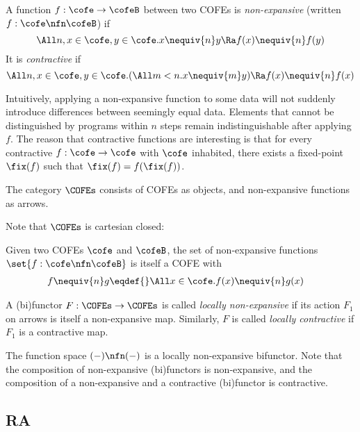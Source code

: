 \begin{defn}
  A function $f : \cofe \to \cofeB$ between two COFEs is \emph{non-expansive} (written $f : \cofe \nfn \cofeB$) if
  \[\All n, x \in \cofe, y \in \cofe. x \nequiv{n} y \Ra f(x) \nequiv{n} f(y) \]
  It is \emph{contractive} if
  \[ \All n, x \in \cofe, y \in \cofe. (\All m < n. x \nequiv{m} y) \Ra f(x) \nequiv{n} f(x) \]
\end{defn}
Intuitively, applying a non-expansive function to some data will not suddenly introduce differences between seemingly equal data.
Elements that cannot be distinguished by programs within $n$ steps remain indistinguishable after applying $f$.
The reason that contractive functions are interesting is that for every contractive $f : \cofe \to \cofe$ with $\cofe$ inhabited, there exists a fixed-point $\fix(f)$ such that $\fix(f) = f(\fix(f))$.

\begin{defn}
  The category $\COFEs$ consists of COFEs as objects, and non-expansive functions as arrows.
\end{defn}

Note that $\COFEs$ is cartesian closed:
\begin{defn}
  Given two COFEs $\cofe$ and $\cofeB$, the set of non-expansive functions $\set{f : \cofe \nfn \cofeB}$ is itself a COFE with
  \begin{align*}
    f \nequiv{n} g \eqdef{}& \All x \in \cofe. f(x) \nequiv{n} g(x)
  \end{align*}
\end{defn}

\begin{defn}
  A (bi)functor $F : \COFEs \to \COFEs$ is called \emph{locally non-expansive} if its action $F_1$ on arrows is itself a non-expansive map.
  Similarly, $F$ is called \emph{locally contractive} if $F_1$ is a contractive map.
\end{defn}
The function space $(-) \nfn (-)$ is a locally non-expansive bifunctor.
Note that the composition of non-expansive (bi)functors is non-expansive, and the composition of a non-expansive and a contractive (bi)functor is contractive.

\subsection{RA}
\newcommand\dummymelt\bot

